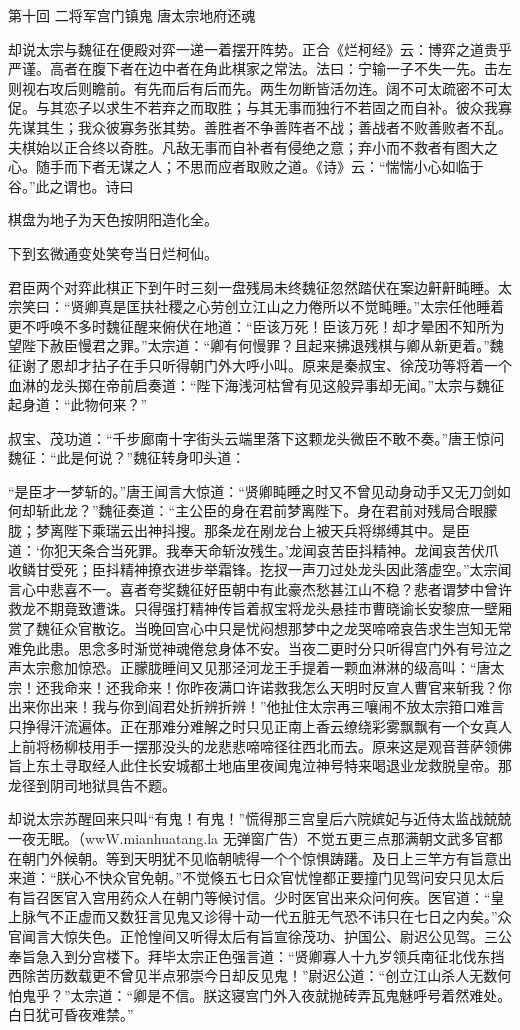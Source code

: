 \documentclass[12pt,UTF8]{ctexbook}
\begin{document}
{第十回 二将军宫门镇鬼 唐太宗地府还魂

却说太宗与魏征在便殿对弈一递一着摆开阵势。正合《烂柯经》云：博弈之道贵乎严谨。高者在腹下者在边中者在角此棋家之常法。法曰：宁输一子不失一先。击左则视右攻后则瞻前。有先而后有后而先。两生勿断皆活勿连。阔不可太疏密不可太促。与其恋子以求生不若弃之而取胜；与其无事而独行不若固之而自补。彼众我寡先谋其生；我众彼寡务张其势。善胜者不争善阵者不战；善战者不败善败者不乱。夫棋始以正合终以奇胜。凡敌无事而自补者有侵绝之意；弃小而不救者有图大之心。随手而下者无谋之人；不思而应者取败之道。《诗》云：“惴惴小心如临于谷。”此之谓也。诗曰

棋盘为地子为天色按阴阳造化全。

下到玄微通变处笑夸当日烂柯仙。

君臣两个对弈此棋正下到午时三刻一盘残局未终魏征忽然踏伏在案边鼾鼾盹睡。太宗笑曰：“贤卿真是匡扶社稷之心劳创立江山之力倦所以不觉盹睡。”太宗任他睡着更不呼唤不多时魏征醒来俯伏在地道：“臣该万死！臣该万死！却才晕困不知所为望陛下赦臣慢君之罪。”太宗道：“卿有何慢罪？且起来拂退残棋与卿从新更着。”魏征谢了恩却才拈子在手只听得朝门外大呼小叫。原来是秦叔宝、徐茂功等将着一个血淋的龙头掷在帝前启奏道：“陛下海浅河枯曾有见这般异事却无闻。”太宗与魏征起身道：“此物何来？”

叔宝、茂功道：“千步廊南十字街头云端里落下这颗龙头微臣不敢不奏。”唐王惊问魏征：“此是何说？”魏征转身叩头道：

“是臣才一梦斩的。”唐王闻言大惊道：“贤卿盹睡之时又不曾见动身动手又无刀剑如何却斩此龙？”魏征奏道：“主公臣的身在君前梦离陛下。身在君前对残局合眼朦胧；梦离陛下乘瑞云出神抖搜。那条龙在剐龙台上被天兵将绑缚其中。是臣道：‘你犯天条合当死罪。我奉天命斩汝残生。’龙闻哀苦臣抖精神。龙闻哀苦伏爪收鳞甘受死；臣抖精神撩衣进步举霜锋。扢扠一声刀过处龙头因此落虚空。”太宗闻言心中悲喜不一。喜者夸奖魏征好臣朝中有此豪杰愁甚江山不稳？悲者谓梦中曾许救龙不期竟致遭诛。只得强打精神传旨着叔宝将龙头悬挂市曹晓谕长安黎庶一壁厢赏了魏征众官散讫。当晚回宫心中只是忧闷想那梦中之龙哭啼啼哀告求生岂知无常难免此患。思念多时渐觉神魂倦怠身体不安。当夜二更时分只听得宫门外有号泣之声太宗愈加惊恐。正朦胧睡间又见那泾河龙王手提着一颗血淋淋的级高叫：“唐太宗！还我命来！还我命来！你昨夜满口许诺救我怎么天明时反宣人曹官来斩我？你出来你出来！我与你到阎君处折辨折辨！”他扯住太宗再三嚷闹不放太宗箝口难言只挣得汗流遍体。正在那难分难解之时只见正南上香云缭绕彩雾飘飘有一个女真人上前将杨柳枝用手一摆那没头的龙悲悲啼啼径往西北而去。原来这是观音菩萨领佛旨上东土寻取经人此住长安城都土地庙里夜闻鬼泣神号特来喝退业龙救脱皇帝。那龙径到阴司地狱具告不题。

却说太宗苏醒回来只叫“有鬼！有鬼！”慌得那三宫皇后六院嫔妃与近侍太监战兢兢一夜无眠。（wwW.mianhuatang.la 无弹窗广告）不觉五更三点那满朝文武多官都在朝门外候朝。等到天明犹不见临朝唬得一个个惊惧踌躇。及日上三竿方有旨意出来道：“朕心不快众官免朝。”不觉倏五七日众官忧惶都正要撞门见驾问安只见太后有旨召医官入宫用药众人在朝门等候讨信。少时医官出来众问何疾。医官道：“皇上脉气不正虚而又数狂言见鬼又诊得十动一代五脏无气恐不讳只在七日之内矣。”众官闻言大惊失色。正怆惶间又听得太后有旨宣徐茂功、护国公、尉迟公见驾。三公奉旨急入到分宫楼下。拜毕太宗正色强言道：“贤卿寡人十九岁领兵南征北伐东挡西除苦历数载更不曾见半点邪崇今日却反见鬼！”尉迟公道：“创立江山杀人无数何怕鬼乎？”太宗道：“卿是不信。朕这寝宫门外入夜就抛砖弄瓦鬼魅呼号着然难处。白日犹可昏夜难禁。”

}
\end{document}
